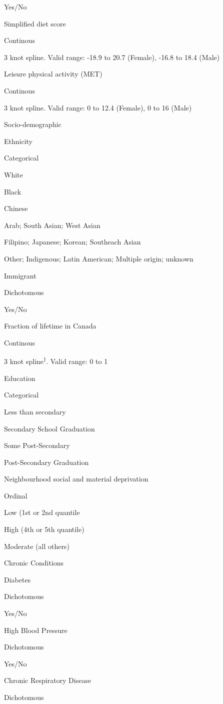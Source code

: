 \documentclass[]{book}
\begin{document}
Yes/No

Simplified diet score

Continous

3 knot spline. Valid range: -18.9 to 20.7 (Female), -16.8 to 18.4 (Male)

Leisure physical activity (MET)

Continous

3 knot spline. Valid range: 0 to 12.4 (Female), 0 to 16 (Male)

Socio-demographic

Ethnicity

Categorical

White

Black

Chinese

Arab; South Asian; West Asian

Filipino; Japanese; Korean; Southeach Asian

Other; Indigenous; Latin American; Multiple origin; unknown

Immigrant

Dichotomous

Yes/No

Fraction of lifetime in Canada

Continous

3 knot spline\textsuperscript{†}. Valid range: 0 to 1

Education

Categorical

Less than secondary

Secondary School Graduation

Some Post-Secondary

Post-Secondary Graduation

Neighbourhood social and material deprivation

Ordinal

Low (1st or 2nd quantile

High (4th or 5th quantile)

Moderate (all others)

Chronic Conditions

Diabetes

Dichotomous

Yes/No

High Blood Pressure

Dichotomous

Yes/No

Chronic Respiratory Disease

Dichotomous
\end{document}
